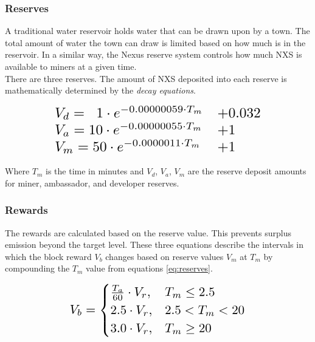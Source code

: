 \documentclass[11pt]{article}
\begin{document}
\subsubsection{Reserves}

A traditional water reservoir holds water that can be drawn upon by a town.
The total amount of water the town can draw is limited based on how much is in the reservoir.
In a similar way, the Nexus reserve system controls how much NXS is available to miners at a given time.\\ 

\noindent There are three reserves.
The amount of NXS deposited into each reserve is 
mathematically determined by the \textit{decay equations}.

\begin{equation}\label{eq:reserves}
\resizebox{.75\hsize}{!}{$
\begin{array}{ll}
      V_{d} = \;\;1 \cdot e^{-0.00000059 \cdot T_{m}} & + 0.032 \\
      V_{a} = 10 \cdot e^{-0.00000055 \cdot T_{m}} & + 1 \\
      V_{m} = 50 \cdot e^{-0.0000011 \cdot T_{m}} & + 1 \\
\end{array} $}
\end{equation}

\noindent Where $T_m$ is the time in minutes and $V_{d}$, $V_{a}$, $V_{m}$ are the reserve deposit amounts for miner, ambassador, and developer reserves.

\pagebreak
\subsubsection{Rewards}

The rewards are calculated based on the reserve value.
This prevents surplus emission beyond the target level.
\noindent These three equations describe the intervals in which the block reward $V_{b}$ changes
based on reserve values $V_{m}$ at $T_{m}$ by compounding the $T_{m}$ value from equations \ref{eq:reserves}.

\begin{equation}
\resizebox{.60\hsize}{!}{$
    V_b= 
\begin{cases}
    \frac{T_{a}}{60} \cdot V_{r}, & T_{m} \leq 2.5\\
    2.5 \cdot V_{r}, & 2.5 < T_{m} < 20\\
    3.0 \cdot V_{r}, & T_{m} \geq 20
\end{cases}
$}
\end{equation}
\end{document}
